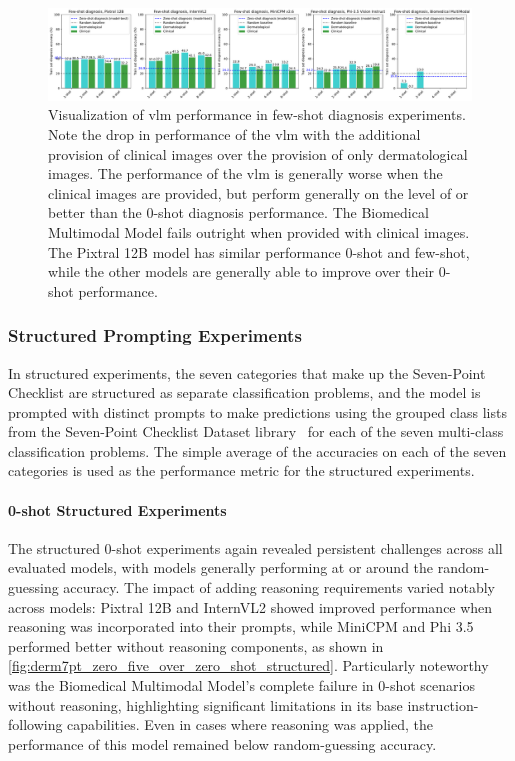 \documentclass[../ShajiS_RnDReport.tex]{subfiles}
\begin{document}
\begin{figure}[ht]
    \centering
    \includegraphics[width=\linewidth]{figures/derm7pt_few_shot_diagnosis_clinical_over_derm.pdf}
    \caption{Visualization of \gls{vlm} performance in few-shot diagnosis experiments. Note the drop in performance of the \gls{vlm} with the additional provision of clinical images over the provision of only dermatological images. The performance of the \gls{vlm} is generally worse when the clinical images are provided, but perform generally on the level of or better than the 0-shot diagnosis performance. The Biomedical Multimodal Model fails outright when provided with clinical images. The Pixtral 12B model has similar performance 0-shot and few-shot, while the other models are generally able to improve over their 0-shot performance.}
    \label{fig:derm7pt_few_shot_diagnosis_clinical_over_derm}
\end{figure}

\subsubsection{Structured Prompting Experiments}
In structured experiments, the seven categories that make up the Seven-Point Checklist are structured as separate classification problems, and the model is prompted with distinct prompts to make predictions using the grouped class lists from the Seven-Point Checklist Dataset library~\cite{Kawahara2019} for each of the seven multi-class classification problems. The simple average of the accuracies on each of the seven categories is used as the performance metric for the structured experiments.

\paragraph{0-shot Structured Experiments}
The structured 0-shot experiments again revealed persistent challenges across all evaluated models, with models generally performing at or around the random-guessing accuracy. The impact of adding reasoning requirements varied notably across models: Pixtral 12B and InternVL2 showed improved performance when reasoning was incorporated into their prompts, while MiniCPM and Phi 3.5 performed better without reasoning components, as shown in \autoref{fig:derm7pt_zero_five_over_zero_shot_structured}. Particularly noteworthy was the Biomedical Multimodal Model's complete failure in 0-shot scenarios without reasoning, highlighting significant limitations in its base instruction-following capabilities. Even in cases where reasoning was applied, the performance of this model remained below random-guessing accuracy.
\end{document}

